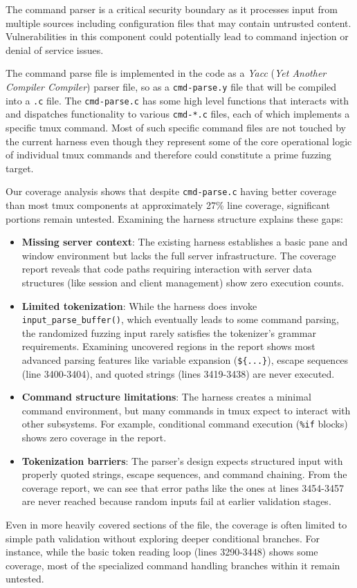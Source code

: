 The command parser is a critical security boundary as it processes input from multiple sources including configuration files that may contain untrusted content. Vulnerabilities in this component could potentially lead to command injection or denial of service issues.

The command parse file is implemented in the code as a \textit{Yacc} (\textit{Yet Another Compiler Compiler}) parser file, so as a \texttt{cmd-parse.y} file that will be compiled into a \texttt{.c} file. The \texttt{cmd-parse.c} has some high level functions that interacts with and dispatches functionality to various \texttt{cmd-*.c} files, each of which implements a specific tmux command. Most of such specific command files are not touched by the current harness even though they represent some of the core operational logic of individual tmux commands and therefore could constitute a prime fuzzing target.

Our coverage analysis shows that despite \texttt{cmd-parse.c} having better coverage than most tmux components at approximately 27\% line coverage, significant portions remain untested. Examining the harness structure explains these gaps:

\begin{itemize}
  \item \textbf{Missing server context}: The existing harness establishes a basic pane and window environment but lacks the full server infrastructure. The coverage report reveals that code paths requiring interaction with server data structures (like session and client management) show zero execution counts.

  \item \textbf{Limited tokenization}: While the harness does invoke \texttt{input\_parse\_buffer()}, which eventually leads to some command parsing, the randomized fuzzing input rarely satisfies the tokenizer's grammar requirements. Examining uncovered regions in the report shows most advanced parsing features like variable expansion (\texttt{\$\{...\}}), escape sequences (line 3400-3404), and quoted strings (lines 3419-3438) are never executed.

  \item \textbf{Command structure limitations}: The harness creates a minimal command environment, but many commands in tmux expect to interact with other subsystems. For example, conditional command execution (\texttt{\%if} blocks) shows zero coverage in the report.

  \item \textbf{Tokenization barriers}: The parser's design expects structured input with properly quoted strings, escape sequences, and command chaining. From the coverage report, we can see that error paths like the ones at lines 3454-3457 are never reached because random inputs fail at earlier validation stages.
\end{itemize}

Even in more heavily covered sections of the file, the coverage is often limited to simple path validation without exploring deeper conditional branches. For instance, while the basic token reading loop (lines 3290-3448) shows some coverage, most of the specialized command handling branches within it remain untested.
